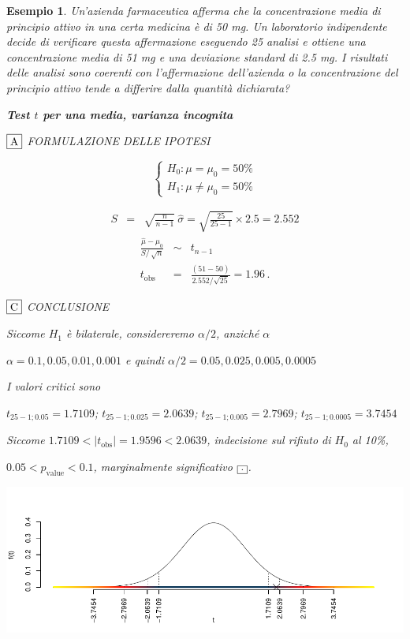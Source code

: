 \documentclass[
  11pt,
]{book}
\theoremstyle{mytheoremstyle}
\theoremstyle{mydefstyle}
\newtheorem{example}{{Esempio}}[section]
\begin{document}
\begin{example}
Un'azienda farmaceutica afferma che la concentrazione media di principio attivo
in una certa medicina è di 50 mg. Un laboratorio indipendente decide di
verificare questa affermazione eseguendo 25 analisi e ottiene una concentrazione
media di 51 mg e una deviazione standard di 2.5 mg.
I risultati delle analisi sono coerenti con l'affermazione dell'azienda o la
concentrazione del principio attivo tende a differire dalla quantità dichiarata?

\textbf{Test \(t\) per una media, varianza incognita}

\(\fbox{A}\) FORMULAZIONE DELLE IPOTESI

\[\begin{cases}
   H_0: \mu = \mu_0=50\% \\
   H_1: \mu \neq \mu_0=50\% 
   \end{cases}\]

\begin{eqnarray*}
   S    &=& \sqrt{\frac{n} {n-1}}\ \widehat{\sigma} 
   =  \sqrt{\frac{ 25 } { 25 -1}} \times  2.5  =  2.552 
   \end{eqnarray*}
\begin{eqnarray*}
   \frac{\hat\mu - \mu_{0}} {S/\,\sqrt{n}}&\sim&t_{n-1}\\
   t_{\text{obs}}
   &=& \frac{ ( 51 -  50 )} { 2.552 /\sqrt{ 25 }}
   =   1.96 \, .
   \end{eqnarray*}

\(\fbox{C}\) CONCLUSIONE

Siccome \(H_1\) è bilaterale, considereremo \(\alpha/2\),
anziché \(\alpha\)

\(\alpha=0.1, 0.05, 0.01, 0.001\) e quindi \(\alpha/2=0.05, 0.025, 0.005, 0.0005\)

I valori critici sono

\(t_{25-1;0.05}=1.7109\); \(t_{25-1;0.025}=2.0639\); \(t_{25-1;0.005}=2.7969\); \(t_{25-1;0.0005}=3.7454\)

Siccome \(1.7109<|t_\text{obs}|=1.9596<2.0639\), indecisione sul rifiuto di \(H_0\) al 10\%,

\(0.05<p_\text{value}<0.1\), \emph{marginalmente significativo} \(\fbox{.}\).

\begin{center}\includegraphics{Appunti_di_Statistica_2025_files/figure-latex/15-test-mu-pi-8,-1} \end{center}


\end{example}
\end{document}
